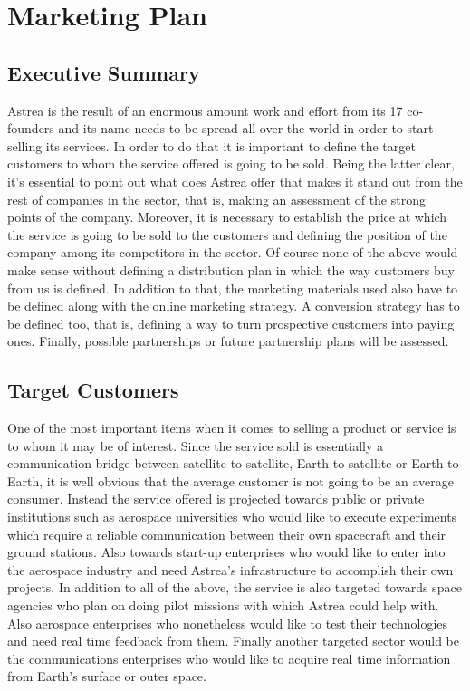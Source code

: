 \section{Marketing Plan}
\subsection{Executive Summary}
Astrea is the result of an enormous amount work and effort from its 17 co-founders and its name needs to be spread all over the world in order to start selling its services. In order to do that it is important to define the target customers to whom the service offered is going to be sold. Being the latter clear, it's essential to point out what does Astrea offer that makes it stand out from the rest of companies in the sector, that is, making an assessment of the strong points of the company. Moreover, it is necessary to establish the price at which the service is going to be sold to the customers and defining the position of the company among its competitors in the sector.
\newline\newline
Of course none of the above would make sense without defining a distribution plan in which the way customers buy from us is defined. In addition to that, the marketing materials used also have to be defined along with the online marketing strategy.
\newline\newline
A conversion strategy has to be defined too, that is, defining a way to turn prospective customers into paying ones. Finally, possible partnerships or future partnership plans will be assessed.
\subsection{Target Customers}
One of the most important items when it comes to selling a product or service is to whom it may be of interest. Since the service sold is essentially a communication bridge between satellite-to-satellite, Earth-to-satellite or Earth-to-Earth, it is well obvious that the average customer is not going to be an average consumer.
\newline\newline
Instead the service offered is projected towards public or private institutions such as aerospace universities who would like to execute experiments which require a reliable communication between their own spacecraft and their ground stations. Also towards start-up enterprises who would like to enter into the aerospace industry and need Astrea's infrastructure to accomplish their own projects.
\newline\newline
In addition to all of the above, the service is also targeted towards space agencies who plan on doing pilot missions with which Astrea could help with. Also aerospace enterprises who nonetheless would like to test their technologies and need real time feedback from them. Finally another targeted sector would be the communications enterprises who would like to acquire real time information from Earth's surface or outer space.
